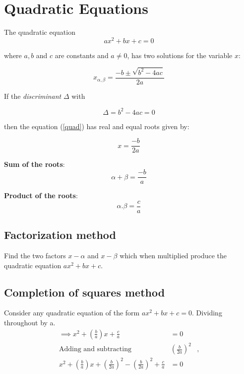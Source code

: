 \section{Quadratic Equations}

The quadratic equation 
\begin{equation}
\label{quad}
ax^2+bx+c = 0
\end{equation}

where \(a,b\) and \(c\) are constants and \(a \neq 0\), has two solutions for the variable \(x\):

\begin{equation}
\label{root}
x_{\alpha,\beta} = \frac{-b \pm \sqrt{b^2 - 4ac}}{2a}
\end{equation}

If the \emph{discriminant} \( \Delta \) with 

\begin{equation}
\label{delta}
\Delta = b^2 - 4ac = 0
\end{equation}

then the equation (\ref{quad}) has real and equal roots given by:

\begin{equation}
\label{equal_root}
x = \frac{-b}{2a}
\end{equation}

\textbf{Sum of the roots}:
\begin{equation}
\label{sum_root}
\alpha + \beta = \frac{-b}{a}
\end{equation}

\textbf{Product of the roots}:
\begin{equation}
\label{product_root}
\alpha.\beta = \frac{c}{a}
\end{equation}

\subsection{Factorization method}
Find the two factors $x-\alpha$ and $x-\beta$ which when multiplied produce the quadratic equation $ax^2+bx+c$. 

\subsection{Completion of squares method}
Consider any quadratic equation of the form $ax^2+bx+c = 0$. Dividing throughout by a.
\begin{align*}
\implies x^2+ \left(\frac{b}{a}\right) x +\frac{c}{a} &=0\\
\text{Adding and subtracting} &\left(\frac{b}{2a}\right)^{2}&,\\
x^2 + \left(\frac{b}{a}\right)x + \left(\frac{b}{2a}\right)^{2} - \left(\frac{b}{2a}\right)^{2} + \frac{c}{a} &=0\\
\end{align*}


